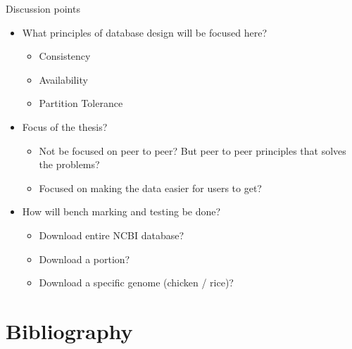 \documentclass{beamer}
\begin{document}
\begin{frame}
\Huge{\centerline{Discussion points}}
\small{

\begin{itemize}
    \item What principles of database design will be focused here?
        \begin{itemize}
            \item Consistency
            \item Availability
            \item Partition Tolerance
        \end{itemize}
    \item Focus of the thesis?
    \begin{itemize}
        \item Not be focused on peer to peer? But peer to peer principles that solves the problems?
        \item Focused on making the data easier for users to get?
    \end{itemize}
    \item How will bench marking and testing be done?
    \begin{itemize}
        \item Download entire NCBI database?
        \item Download a portion?
        \item Download a specific genome (chicken / rice)?
    \end{itemize}
\end{itemize}

}
\end{frame}

\section{Bibliography}

\begin{frame}[allowframebreaks]
\printbibliography[heading=none]
\end{frame}
\end{document}

